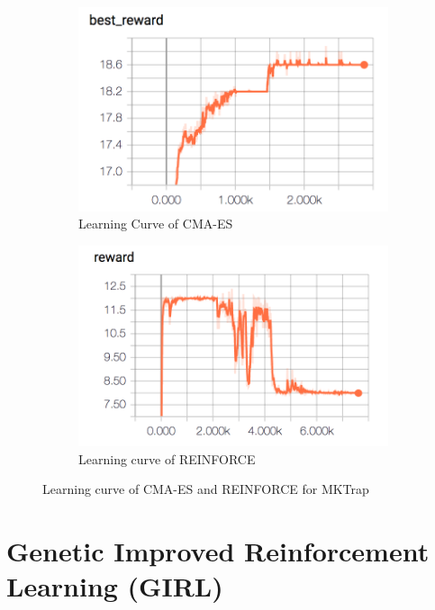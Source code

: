 \documentclass[a4paper]{article}
\begin{document}
\begin{figure}[H]
\centering
\begin{subfigure}{.45\textwidth}
  \includegraphics[width=\linewidth]{figures/cmaes-mktrap.png}
  \caption{Learning Curve of CMA-ES}
  \label{fig:learning-curve-cma-es-mktrap}
\end{subfigure}
\begin{subfigure}{.45\textwidth}
  \includegraphics[width=\linewidth]{figures/reinforce-mktrap.png}
  \caption{Learning curve of REINFORCE}
  \label{fig:learning-curve-reinforce-mktrap}
\end{subfigure}
\caption{Learning curve of CMA-ES and REINFORCE for MKTrap}
\label{fig:learning-curve-cma-es-dqn-reinforce-mktrap}
\end{figure}


\section{Genetic Improved Reinforcement Learning (GIRL)}
\label{sec:GIRL}
\end{document}
